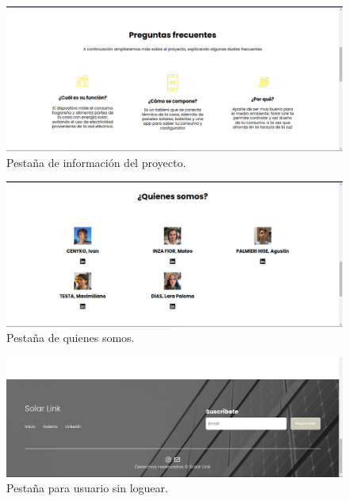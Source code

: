 \begin{figure}[H]
    \centering
    \includegraphics[width=1\linewidth]{web/Captura desde 2023-10-15 22-37-32.png}
    \caption{Pestaña de información del proyecto.}
    \label{fig:info-pry}
\end{figure}

\begin{figure}
    \centering
    \includegraphics[width=1\linewidth]{web/Captura desde 2023-10-15 22-37-40.png}
    \caption{Pestaña de quienes somos.}
    \label{fig:quienes-somos}
\end{figure}

\begin{figure}[H]
    \centering
    \includegraphics[width=1\linewidth]{web/Captura desde 2023-10-15 22-37-49.png}
    \caption{Pestaña para usuario sin loguear.}
    \label{fig:no-log-user}
\end{figure}

